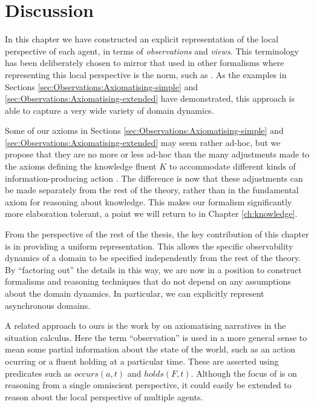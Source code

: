 \section{Discussion\label{sec:Observations:Discussion}}

In this chapter we have constructed an explicit representation of
the local perspective of each agent, in terms of \emph{observations}
and \emph{views}. This terminology has been deliberately chosen to
mirror that used in other formalisms where representing this local
perspective is the norm, such as \citep{parikh85dist_knowledge,halpern90knowledge_distrib}.
As the examples in Sections \ref{sec:Observations:Axiomatising-simple}
and \ref{sec:Observations:Axiomatising-extended} have demonstrated,
this approach is able to capture a very wide variety of domain dynamics.

Some of our axioms in Sections \ref{sec:Observations:Axiomatising-simple}
and \ref{sec:Observations:Axiomatising-extended} may seem rather
ad-hoc, but we propose that they are no more or less ad-hoc than the
many adjustments made to the axioms defining the knowledge fluent
$K$ to accommodate different kinds of information-producing action
\citep{shapiro98specifying_ma_systems,Lesperance99sitcalc_approach,shapiro01casl_feat_inter,Petrick06thesis,shapiro07sc_goal_change}.
The difference is now that these adjustments can be made separately
from the rest of the theory, rather than in the fundamental axiom
for reasoning about knowledge. This makes our formalism significantly
more elaboration tolerant, a point we will return to in Chapter \ref{ch:knowledge}.

From the perspective of the rest of the thesis, the key contribution
of this chapter is in providing a uniform representation. This allows
the specific observability dynamics of a domain to be specified independently
from the rest of the theory. By {}``factoring out'' the details
in this way, we are now in a position to construct formalisms and
reasoning techniques that do not depend on any assumptions about the
domain dynamics. In particular, we can explicitly represent asynchronous
domains.

A related approach to ours is the work by \citet{pinto98sc_observations}
on axiomatising narratives in the situation calculus. Here the term
{}``observation'' is used in a more general sense to mean some partial
information about the state of the world, such as an action ocurring
or a fluent holding at a particular time. These are asserted using
predicates such as $occurs(a,t)$ and $holds(F,t)$. Although the
focus of \citep{pinto98sc_observations} is on reasoning from a single
omniscient perspective, it could easily be extended to reason about
the local perspective of multiple agents.

